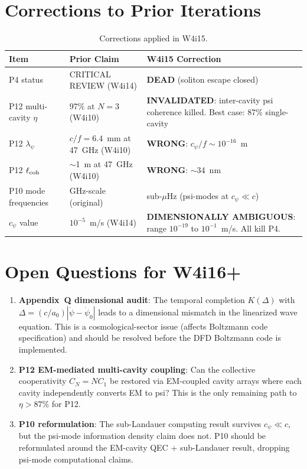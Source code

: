 \documentclass[11pt]{article}
\begin{document}
\section{Corrections to Prior Iterations}

\begin{table}[H]
\centering
\caption{Corrections applied in W4i15.}
\begin{tabular}{@{}lp{4.5cm}p{4.5cm}@{}}
\toprule
Item & Prior Claim & W4i15 Correction \\
\midrule
P4 status & CRITICAL REVIEW (W4i14) & \textbf{DEAD} (soliton escape closed) \\
P12 multi-cavity $\eta$ & 97\% at $N = 3$ (W4i10) & \textbf{INVALIDATED}: inter-cavity
  psi coherence killed. Best case: 87\% single-cavity \\
P12 $\lambda_\psi$ & $c/f = 6.4$~mm at 47~GHz (W4i10) & \textbf{WRONG}:
  $c_\psi/f \sim 10^{-16}$~m \\
P12 $\ell_{\rm coh}$ & $\sim$1~m at 47~GHz (W4i10) & \textbf{WRONG}:
  $\sim$34~nm \\
P10 mode frequencies & GHz-scale (original) & sub-$\mu$Hz
  (psi-modes at $c_\psi \ll c$) \\
$c_\psi$ value & $10^{-5}$~m/s (W4i14) & \textbf{DIMENSIONALLY AMBIGUOUS}:
  range $10^{-19}$ to $10^{-1}$~m/s. All kill P4. \\
\bottomrule
\end{tabular}
\end{table}

\section{Open Questions for W4i16+}

\begin{enumerate}
\item \textbf{Appendix~Q dimensional audit}: The temporal completion
  $K(\Delta)$ with $\Delta = (c/a_0)|\dot\psi - \dot\psi_0|$ leads to
  a dimensional mismatch in the linearized wave equation. This is a
  cosmological-sector issue (affects Boltzmann code specification) and
  should be resolved before the DFD Boltzmann code is implemented.

\item \textbf{P12 EM-mediated multi-cavity coupling}: Can the collective
  cooperativity $C_N = NC_1$ be restored via EM-coupled cavity arrays
  where each cavity independently converts EM to psi? This is the only
  remaining path to $\eta > 87\%$ for P12.

\item \textbf{P10 reformulation}: The sub-Landauer computing result
  survives $c_\psi \ll c$, but the psi-mode information density claim
  does not. P10 should be reformulated around the EM-cavity QEC +
  sub-Landauer result, dropping psi-mode computational claims.
\end{enumerate}
\end{document}
